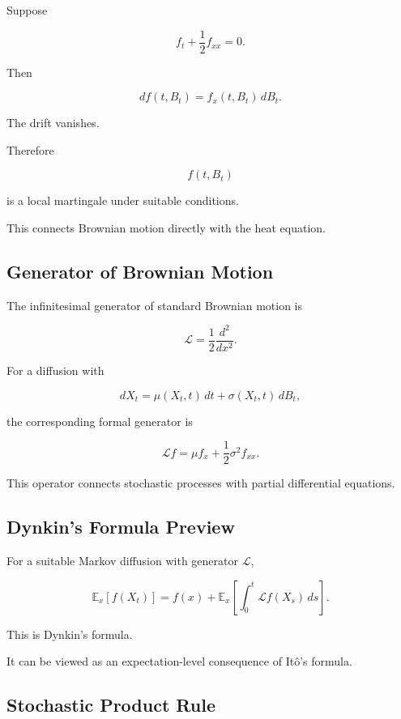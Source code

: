 Suppose

\[
f_t+\frac12f_{xx}=0.
\]

Then

\[
df(t,B_t)
=
f_x(t,B_t)\,dB_t.
\]

The drift vanishes.

Therefore

\[
f(t,B_t)
\]

is a local martingale under suitable conditions.

This connects Brownian motion directly with the heat equation.

\subsection{Generator of Brownian Motion}
\label{subsec:brownian-generator}

The infinitesimal generator of standard Brownian motion is

\[
\boxed{
\mathcal{L}
=
\frac12
\frac{d^2}{dx^2}.
}
\]

For a diffusion with

\[
dX_t
=
\mu(X_t,t)\,dt
+
\sigma(X_t,t)\,dB_t,
\]

the corresponding formal generator is

\[
\boxed{
\mathcal{L}f
=
\mu f_x
+
\frac12\sigma^2f_{xx}.
}
\]

This operator connects stochastic processes with partial differential
equations.

\subsection{Dynkin's Formula Preview}
\label{subsec:dynkin-formula-preview}

For a suitable Markov diffusion with generator \(\mathcal{L}\),

\[
\boxed{
\mathbb{E}_x[f(X_t)]
=
f(x)
+
\mathbb{E}_x
\left[
\int_0^t
\mathcal{L}f(X_s)\,ds
\right].
}
\]

This is Dynkin's formula.

It can be viewed as an expectation-level consequence of It\^o's
formula.

\subsection{Stochastic Product Rule}
\label{subsec:stochastic-product-rule}

